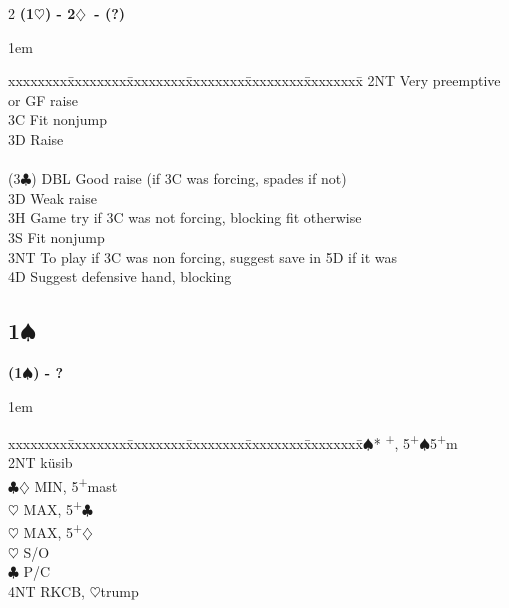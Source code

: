 \documentclass[10pt]{article}
\renewcommand{\c}{$\clubsuit$}
\renewcommand{\d}{$\diamondsuit$}
\newcommand{\h}{$\heartsuit$}
\newcommand{\s}{$\spadesuit$}
\newcommand{\p}{\textsuperscript{+}}
\newenvironment{bidtable}[1][]
{\textbf{#1}
  \begin{adjustwidth}{1em}{}
    \addvspace{2pt}
    \begin{tabbing}
      xxxxxxxx\=xxxxxxxx\=xxxxxxxx\=xxxxxxxx\=xxxxxxxx\=xxxxxxxx\=\kill}
{\end{tabbing}\end{adjustwidth}\bigskip}%
\newcommand{\pdfs}{\texorpdfstring{\s{}}{S}}
\begin{document}
\begin{multicols*}{2}
\begin{bidtable}[(1\h) - 2\d\ - (?)]
       \> 2NT  \> Very preemptive or GF raise                                 \\
       \> 3C   \> Fit nonjump                                                 \\
       \> 3D   \> Raise                                                       \\
                                                                              \\
(3\c)  \> DBL  \> Good raise (if 3C was forcing, spades if not)               \\
       \> 3D   \> Weak raise                                                  \\
       \> 3H   \> Game try if 3C was not forcing, blocking fit otherwise      \\
       \> 3S   \> Fit nonjump                                                 \\
       \> 3NT  \> To play if 3C was non forcing, suggest save in 5D if it was \\
       \> 4D   \> Suggest defensive hand, blocking
\end{bidtable}



\subsection{1\pdfs}

\begin{bidtable}[(1\s) - ?]
2\s* {}\p, 5\p\s 5\p m             \\
     \> 2NT \> küsib                  \\
     \>     \c\d \> MIN, 5\p mast \\
     \>     \h   \> MAX, 5\p\c    \\
     \>     \h   \> MAX, 5\p\d    \\
     \h \> S/O                    \\
     \c \> P/C                    \\
     \> 4NT \> RKCB, \h trump
\end{bidtable}


\end{multicols*}
\end{document}
